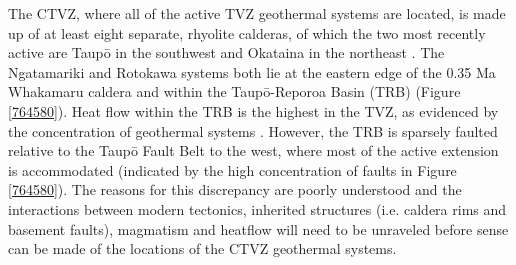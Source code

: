 The CTVZ, where all of the active \acrshort{TVZ} geothermal systems are located, is made up of at least eight separate, rhyolite calderas, of which the two most recently active are Taup\={o} in the southwest and Okataina in the northeast \citep{Wilson_1995}. The Ngatamariki and Rotokawa systems both lie at the eastern edge of the 0.35 Ma Whakamaru caldera and within the Taup\={o}-Reporoa Basin (TRB) \citep{Wilson_2016,Downs_2014} (Figure \ref{764580}). Heat flow within the TRB is the highest in the \acrshort{TVZ}, as evidenced by the concentration of geothermal systems \citep{Wilson_2016}. However, the TRB is sparsely faulted relative to the Taup\={o} Fault Belt to the west, where most of the active extension is accommodated (indicated by the high concentration of faults in Figure \ref{764580}). The reasons for this discrepancy are poorly understood and the interactions between modern tectonics, inherited structures (i.e. caldera rims and basement faults), magmatism and heatflow will need to be unraveled before sense can be made of the locations of the CTVZ geothermal systems.

